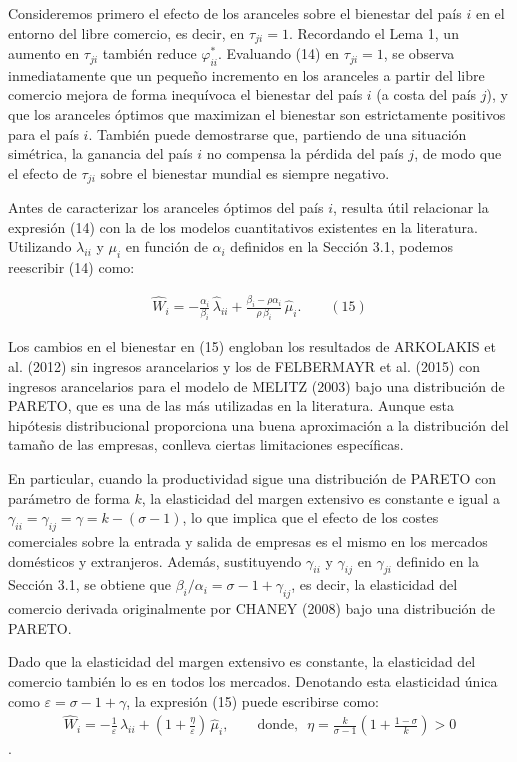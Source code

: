 \documentclass[10pt,a4paper]{article}
\begin{document}
Consideremos primero el efecto de los aranceles sobre el bienestar del país $i$ en el entorno del libre comercio, es decir, en $\tau_{ji} = 1$. Recordando el Lema 1, un aumento en $\tau_{ji}$ también reduce $\varphi_{ii}^*$. Evaluando (14) en $\tau_{ji} = 1$, se observa inmediatamente que un pequeño incremento en los aranceles a partir del libre comercio mejora de forma inequívoca el bienestar del país $i$ (a costa del país $j$), y que los aranceles óptimos que maximizan el bienestar son estrictamente positivos para el país $i$. También puede demostrarse que, partiendo de una situación simétrica, la ganancia del país $i$ no compensa la pérdida del país $j$, de modo que el efecto de $\tau_{ji}$ sobre el bienestar mundial es siempre negativo.

Antes de caracterizar los aranceles óptimos del país $i$, resulta útil relacionar la expresión (14) con la de los modelos cuantitativos existentes en la literatura. Utilizando $\lambda_{ii}$ y $\mu_i$ en función de $\alpha_i$ definidos en la Sección 3.1, podemos reescribir (14) como:

$$\begin{aligned}
    \hat{W}_i =- \frac{\alpha_i}{\beta_i}\,\hat{\lambda}_{ii}+\frac{\beta_i-\rho\alpha_i}{\rho\,\beta_i}\,\hat{\mu}_i.\qquad (15)
\end{aligned}$$

Los cambios en el bienestar en (15) engloban los resultados de ARKOLAKIS et al. (2012) sin ingresos arancelarios y los de FELBERMAYR et al. (2015) con ingresos arancelarios para el modelo de MELITZ (2003) bajo una distribución de PARETO, que es una de las más utilizadas en la literatura. Aunque esta hipótesis distribucional proporciona una buena aproximación a la distribución del tamaño de las empresas, conlleva ciertas limitaciones específicas.

En particular, cuando la productividad sigue una distribución de PARETO con parámetro de forma $k$, la elasticidad del margen extensivo es constante e igual a $\gamma_{ii} = \gamma_{ij} = \gamma = k - (\sigma - 1)$, lo que implica que el efecto de los costes comerciales sobre la entrada y salida de empresas es el mismo en los mercados domésticos y extranjeros. Además, sustituyendo $\gamma_{ii}$ y $\gamma_{ij}$ en $\gamma_{ji}$ definido en la Sección 3.1, se obtiene que $\beta_i/\alpha_i = \sigma - 1 + \gamma_{ij}$, es decir, la elasticidad del comercio derivada originalmente por CHANEY (2008) bajo una distribución de PARETO. 

Dado que la elasticidad del margen extensivo es constante, la elasticidad del comercio también lo es en todos los mercados. Denotando esta elasticidad única como $\varepsilon = \sigma - 1 + \gamma$, la expresión (15) puede escribirse como:
$$\begin{aligned}
    \hat{W}_i =- \frac{1}{\varepsilon}\,\hat{\lambda}_{ii}+\left(1+\frac{\eta}{\varepsilon}\right)\,\hat{\mu}_i,\qquad \text{donde},\,\,\, \eta = \frac{k}{\sigma - 1}\left(1 + \frac{1 - \sigma}{k}\right) > 0
\end{aligned}$$.
\end{document}
